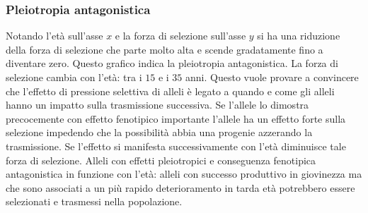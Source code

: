 \subsubsection{Pleiotropia antagonistica}
Notando l'et\`a sull'asse $x$ e la forza di selezione sull'asse $y$ si ha una riduzione della forza di selezione che parte molto alta e scende gradatamente fino a diventare zero. 
Questo grafico indica la pleiotropia antagonistica. La forza di selezione cambia con l'et\`a: tra i $15$ e i $35$ anni. Questo vuole provare a convincere che l'effetto di pressione 
selettiva di alleli \`e legato a quando e come gli alleli hanno un impatto sulla trasmissione successiva. Se l'allele lo dimostra precocemente con effetto fenotipico importante 
l'allele ha un effetto forte sulla selezione impedendo che la possibilit\`a abbia una progenie azzerando la trasmissione. Se l'effetto si manifesta successivamente con l'et\`a diminuisce
tale forza di selezione. Alleli con effetti pleiotropici e conseguenza fenotipica antagonistica in funzione con l'et\`a: alleli con successo produttivo in giovinezza ma che 
sono associati a un pi\`u rapido deterioramento in tarda et\`a potrebbero essere selezionati e trasmessi nella popolazione. 


